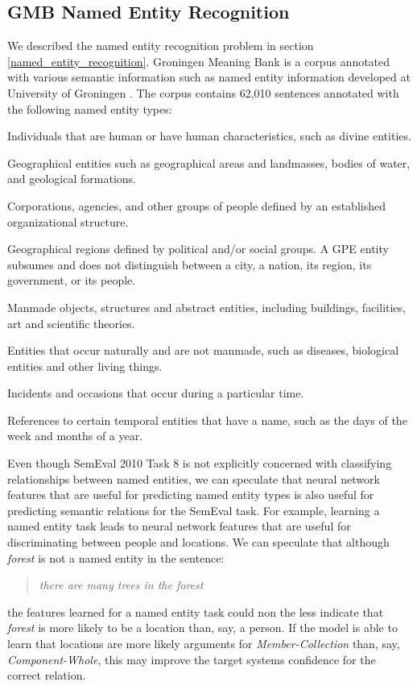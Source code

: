 \subsection{GMB Named Entity Recognition}
We described the named entity recognition problem in section \ref{named_entity_recognition}. Groningen Meaning Bank is a corpus annotated with various semantic information such as named entity information developed at University of Groningen \citep{basile2012}. The corpus contains 62,010 sentences annotated with the following named entity types:

\begin{description}[labelindent=4em, leftmargin=4em]
	\item [Person] Individuals that are human or have human characteristics, such as divine entities.
	\item [Location]  Geographical entities such as geographical areas and landmasses, bodies of water, and geological formations.
	\item [Organization] Corporations, agencies, and other groups of people defined by an established organizational structure.
	\item [Geo-Political Entity] Geographical regions defined by political and/or social groups. A GPE entity subsumes and does not distinguish between a city, a nation, its region, its government, or its people.
	\item [Artifact] Manmade objects, structures and abstract entities, including buildings, facilities, art and scientific theories.
	\item [Natural Object] Entities that occur naturally and are not manmade, such as diseases, biological entities and other living things.
	\item [Event] Incidents and occasions that occur during a particular time.
	\item [Time] References to certain temporal entities that have a name, such as the days of the week and months of a year.
\end{description}
\noindent
Even though SemEval 2010 Task 8 is not explicitly concerned with classifying relationships between named entities, we can speculate that neural network features that are useful for predicting named entity types is also useful for predicting semantic relations for the SemEval task. For example, learning a named entity task leads to neural network features that are useful for discriminating between people and locations. We can speculate that although \textit{forest} is not a named entity in the sentence:
\begin{quote}
\textit{there are many trees in the forest}	
\end{quote}
the features learned for a named entity task could non the less indicate that \textit{forest} is more likely to be a location than, say, a person. If the model is able to learn that locations are more likely arguments for \textit{Member-Collection} than, say, \textit{Component-Whole}, this may improve the target systems confidence for the correct relation.
